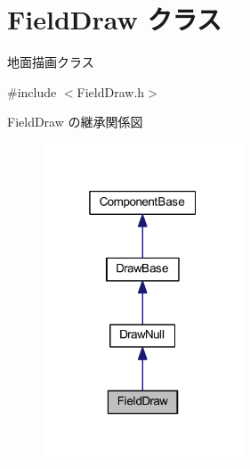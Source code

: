 \hypertarget{class_field_draw}{}\section{Field\+Draw クラス}
\label{class_field_draw}


地面描画クラス  




{\ttfamily \#include $<$Field\+Draw.\+h$>$}



Field\+Draw の継承関係図\nopagebreak
\begin{figure}[H]
\begin{center}
\leavevmode
\includegraphics[width=169pt]{class_field_draw__inherit__graph}
\end{center}
\end{figure}
